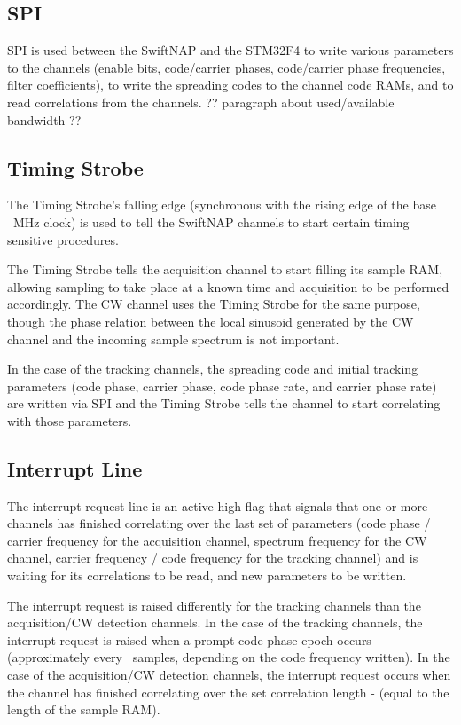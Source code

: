\documentclass{article}
\begin{document}
\begin{multicols}{2}
\subsection{SPI}
SPI is used between the SwiftNAP and the STM32F4 to write various parameters to the channels (enable bits, code/carrier phases, code/carrier phase frequencies, filter coefficients), to write the spreading codes to the channel code RAMs, and to read correlations from the channels. ?? paragraph about used/available bandwidth ??
\subsection{Timing Strobe} 
The Timing Strobe's falling edge (synchronous with the rising edge of the base \feclkfreq\ MHz clock) is used to tell the SwiftNAP channels to start certain timing sensitive procedures. 

The Timing Strobe tells the acquisition channel to start filling its sample RAM, allowing sampling to take place at a known time and acquisition to be performed accordingly. The CW channel uses the Timing Strobe for the same purpose, though the phase relation between the local sinusoid generated by the CW channel and the incoming sample spectrum is not important. 

In the case of the tracking channels, the spreading code and initial tracking parameters (code phase, carrier phase, code phase rate, and carrier phase rate) are written via SPI and the Timing Strobe tells the channel to start correlating with those parameters.
\subsection{Interrupt Line}
The interrupt request line is an active-high flag that signals that one or more channels has finished correlating over the last set of parameters (code phase / carrier frequency for the acquisition channel, spectrum frequency for the CW channel, carrier frequency / code frequency for the tracking channel) and is waiting for its correlations to be read, and new parameters to be written.

The interrupt request is raised differently for the tracking channels than the acquisition/CW detection channels. In the case of the tracking channels, the interrupt request is raised when a prompt code phase epoch occurs (approximately every \samplesperms\ samples, depending on the code frequency written). In the case of the acquisition/CW detection channels, the interrupt request occurs when the channel has finished correlating over the set correlation length - (equal to the length of the sample RAM).

\end{multicols}
\end{document}
